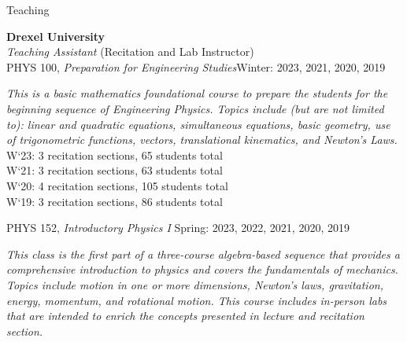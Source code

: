 \documentclass{resume} %
\newcommand{\forceindent}{\leavevmode{\parindent=1em\indent}}
\begin{document}


\begin{rSection}{Teaching}

\textbf{Drexel University} \\ 
\textit{Teaching Assistant} (Recitation and Lab Instructor)\\
\forceindent PHYS 100, \textit{Preparation for Engineering Studies}\hfill {Winter: 2023, 2021, 2020, 2019}
\begin{description}[leftmargin=2em, style=nextline]
\vspace{-0.5em}
\item[~] \textit{This is a basic mathematics foundational course to prepare the students for the beginning sequence of Engineering Physics. Topics include (but are not limited to): linear and quadratic equations, simultaneous equations, basic geometry, use of trigonometric functions, vectors, translational kinematics, and Newton’s Laws.} \\
\forceindent \forceindent W`23: 3 recitation sections, 65 students total\\
\forceindent \forceindent W`21: 3 recitation sections, 63 students total\\
\forceindent \forceindent W`20: 4 recitation sections, 105 students total\\
\forceindent \forceindent W`19: 3 recitation sections, 86 students total
\end{description}
\vspace{-0.5em}
\forceindent PHYS 152, \textit{Introductory Physics I}  \hfill {Spring: 2023, 2022, 2021, 2020, 2019}
\begin{description}[leftmargin=2em, style=nextline]
\vspace{-0.5em}
\item[~]\textit{This class is the first part of a three-course algebra-based sequence that provides a comprehensive introduction to physics and covers the fundamentals of mechanics. Topics include motion in one or more dimensions, Newton’s laws, gravitation, energy, momentum, and rotational motion. This course includes in-person labs that are intended to enrich the concepts presented in lecture and recitation section.} \\

\end{description}
\end{rSection}
\end{document}
